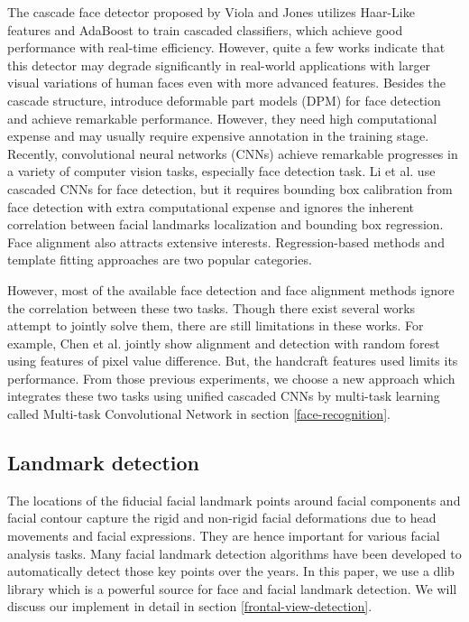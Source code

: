 \documentclass[journal, twocolumn]{IEEEtran}
\begin{document}
The cascade face detector proposed by Viola and Jones \cite{ref:detect-1} utilizes Haar-Like features and AdaBoost to train cascaded classifiers, which achieve good performance with real-time
efficiency. However, quite a few works \cite{ref:detect-2}\cite{ref:detect-3}\cite{ref:detect-4} indicate that this detector may degrade significantly in real-world applications with larger visual variations of human faces even with more advanced features. Besides the cascade structure, \cite{ref:detect-5}\cite{ref:detect-6}\cite{ref:detect-7} introduce deformable part models (DPM) for face detection and achieve remarkable performance. However, they need high computational expense and may usually require expensive annotation in the training stage. Recently, convolutional neural networks (CNNs) achieve remarkable progresses in a variety of computer vision tasks, especially face detection task. Li et al. \cite{ref:detect-8} use cascaded CNNs for face detection, but it requires bounding box calibration from face detection with extra computational expense and ignores the inherent correlation between facial landmarks localization and bounding box regression. Face alignment also attracts extensive interests. Regression-based methods \cite{ref:detect-9}\cite{ref:detect-10}\cite{ref:detect-11} and template fitting approaches \cite{ref:detect-12}\cite{ref:detect-13}\cite{ref:detect-7} are two popular categories.

However, most of the available face detection and face alignment methods ignore the correlation between these two tasks. Though there exist several works attempt to jointly solve them, there are still limitations in these works. For example, Chen et al. \cite{ref:detect-14} jointly show alignment and detection with random forest using features of pixel value difference. But, the handcraft features used limits its performance. From those previous experiments, we choose a new approach which integrates these two tasks using unified cascaded CNNs by multi-task learning called Multi-task Convolutional Network in section \ref{face-recognition}.


\subsection{Landmark detection}
The locations of the fiducial facial landmark points around facial components and facial contour capture the rigid and non-rigid facial deformations due to head movements and facial expressions.  They are hence important for various facial analysis tasks. Many facial landmark detection algorithms have been developed to automatically detect those key points over the years. In this paper, we use a dlib library which is a powerful source for face and facial landmark detection. We will discuss our implement in detail in section \ref{frontal-view-detection}.
\end{document}
